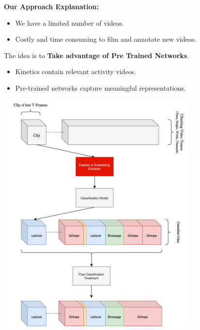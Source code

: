 \begin{frame}
    \begin{minipage}{0.5\textwidth}
        \textbf{Our Approach Explanation:}

        \vspace{0.5em}
        
        \begin{itemize}
            \item We have a limited number of videos.
            \item Costly and time consuming to film and annotate new videos.
        \end{itemize}

        \vspace{0.5em}

        The idea is to \textbf{Take advantage of Pre Trained Networks}.

        \vspace{0.5em}

        \begin{itemize}
            \item Kinetics contain relevant activity videos.
            \item Pre-trained networks capture meaningful representations.
        \end{itemize}

    \end{minipage}%
    \hfill
    \begin{minipage}{0.5\textwidth}
        \centering
        \includegraphics[width=0.75\textwidth]{assets/visuals/research-project-visual.drawio.png}
    \end{minipage}
\end{frame}